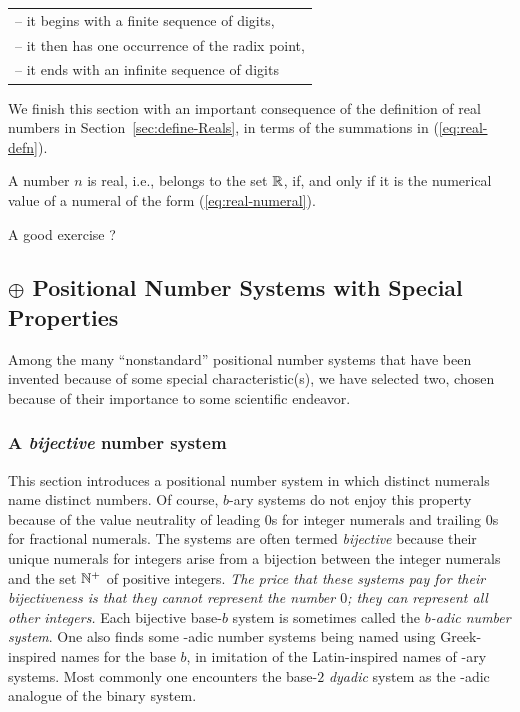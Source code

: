 \hspace*{.15in}
\begin{tabular}{l}
-- it begins with a finite sequence of digits, \\
-- it then has one occurrence of the radix point, \\
-- it ends with an infinite sequence of digits
\end{tabular}

\bigskip

We finish this section with an important consequence of the definition
of real numbers in Section~\ref{sec:define-Reals}, in terms of the
summations in (\ref{eq:real-defn}).

\begin{prop}
\label{thm:define-Reals-via-numerals}
A number $n$ is real, i.e., belongs to the set $\mathbb{R}$, if, and only if
it is the numerical value of a numeral of the form
(\ref{eq:real-numeral}).
\end{prop}

{\Arny A good exercise ?}

\subsection{$\oplus$ Positional Number Systems with Special Properties}
\label{sec:numerals-special-properties}

Among the many ``nonstandard'' positional number systems that have
been invented because of some special characteristic(s), we have
selected two, chosen because of their importance to some scientific
endeavor.

\subsubsection{A {\em bijective} number system}
\label{sec:bijective-adic}

This section introduces a positional number system in which distinct
numerals name distinct numbers.  Of course, $b$-ary systems do not
enjoy this property because of the value neutrality of leading $0$s
for integer numerals and trailing $0$s for fractional numerals.  The
systems are often termed {\it bijective} because their unique numerals
for integers arise from a bijection between the integer numerals and
the set $\mathbb{N}^+$ of positive integers.  {\em The price that these
  systems pay for their bijectiveness is that they cannot represent
  the number $0$; they can represent all other integers.}  Each
bijective base-$b$ system is sometimes called the {\it $b$-adic number
  system}.  One also finds
some -adic number systems being named using Greek-inspired names for
the base $b$, in imitation of the Latin-inspired names of -ary
systems.  Most commonly one encounters the base-$2$ {\it dyadic}
 system as the -adic analogue
of the binary system.

